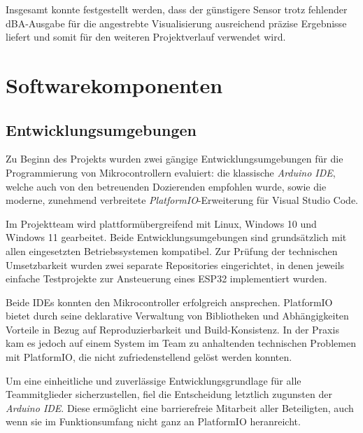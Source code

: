 Insgesamt konnte festgestellt werden, dass der günstigere Sensor trotz fehlender dBA-Ausgabe für die angestrebte Visualisierung ausreichend präzise Ergebnisse liefert und somit für den weiteren Projektverlauf verwendet wird.

\section{Softwarekomponenten}
\subsection{Entwicklungsumgebungen}

Zu Beginn des Projekts wurden zwei gängige Entwicklungsumgebungen für die Programmierung von Mikrocontrollern evaluiert: die klassische \textit{Arduino IDE}, welche auch von den betreuenden Dozierenden empfohlen wurde, sowie die moderne, zunehmend verbreitete \textit{PlatformIO}-Erweiterung für Visual Studio Code.

Im Projektteam wird plattformübergreifend mit Linux, Windows 10 und Windows 11 gearbeitet. Beide Entwicklungsumgebungen sind grundsätzlich mit allen eingesetzten Betriebssystemen kompatibel. Zur Prüfung der technischen Umsetzbarkeit wurden zwei separate Repositories eingerichtet, in denen jeweils einfache Testprojekte zur Ansteuerung eines ESP32 implementiert wurden.

Beide IDEs konnten den Mikrocontroller erfolgreich ansprechen. PlatformIO bietet durch seine deklarative Verwaltung von Bibliotheken und Abhängigkeiten Vorteile in Bezug auf Reproduzierbarkeit und Build-Konsistenz. In der Praxis kam es jedoch auf einem System im Team zu anhaltenden technischen Problemen mit PlatformIO, die nicht zufriedenstellend gelöst werden konnten.

Um eine einheitliche und zuverlässige Entwicklungsgrundlage für alle Teammitglieder sicherzustellen, fiel die Entscheidung letztlich zugunsten der \textit{Arduino IDE}. Diese ermöglicht eine barrierefreie Mitarbeit aller Beteiligten, auch wenn sie im Funktionsumfang nicht ganz an PlatformIO heranreicht.

